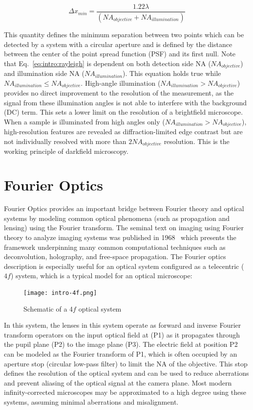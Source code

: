 \begin{equation}\label{eq:intro:rayleigh}
\Delta x_{min}  = \frac{1.22 \lambda}{(NA_{objective} + NA_{illumination})}
\end{equation}

This quantity defines the minimum separation between two points which can be detected by a system with a circular aperture and is defined by the distance between the center of the point spread function (PSF) and its first null. Note that Eq.~\ref{eq:intro:rayleigh} is dependent on both detection side NA ($NA_{objective}$) and illumination side NA ($NA_{illumination}$).
This equation holds true while $NA_{illumination} \leq NA_{objective}$. High-angle illumination ($NA_{illumination} > NA_{objective}$) provides no direct improvement to the resolution of the measurement, as the signal from these illumination angles is not able to interfere with the background (DC) term. This sets a lower limit on the resolution of a brightfield microscope. When a sample is illuminated from high angles only ($NA_{illumination} > NA_{objective}$), high-resolution features are revealed as diffraction-limited edge contrast but are not individually resolved with more than $2NA_{objective}$ resolution. This is the working principle of darkfield microscopy.

\section{Fourier Optics}
Fourier Optics provides an important bridge between Fourier theory and optical systems by modeling common optical phenomena (such as propagation and lensing) using the Fourier transform. The seminal text on imaging using Fourier theory to analyze imaging systems was published in 1968~\cite{goodman:68} which presents the framework underpinning many common computational techniques such as deconvolution, holography, and free-space propagation. The Fourier optics description is especially useful for an optical system configured as a telecentric ($4f$) system, which is a typical model for an optical microscope:

\begin{figure}[tbh]
\centering
\texttt{[image: intro-4f.png]}
\caption{\label{fig:4f} Schematic of a 4$f$ optical system}
\end{figure}

\noindent In this system, the lenses in this system operate as forward and inverse Fourier transform operators on the input optical field at (P1) as it propagates through the pupil plane (P2) to the image plane (P3). The electric field at position P2 can be modeled as the Fourier transform of P1, which is often occupied by an aperture stop (circular low-pass filter) to limit the NA of the objective. This stop defines the resolution of the optical system and can be used to reduce aberrations and prevent aliasing of the optical signal at the camera plane. Most modern infinity-corrected microscopes may be approximated to a high degree using these systems, assuming minimal aberrations and misalignment.

